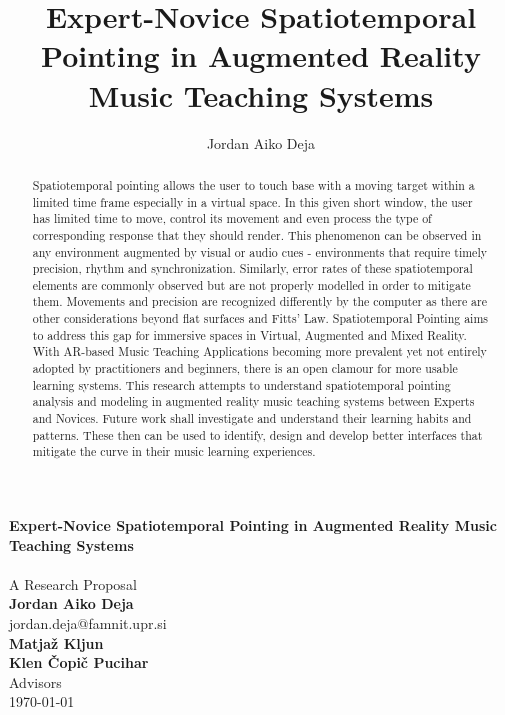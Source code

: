 \documentclass{article}
\title{Expert-Novice Spatiotemporal Pointing in Augmented Reality Music Teaching Systems}
\author{Jordan Aiko Deja}
\begin{document}
\begin{center}
\large \textbf{Expert-Novice Spatiotemporal Pointing in Augmented Reality Music Teaching Systems}
\\            
\vspace{0.5cm}\\
A Research Proposal\\
\vspace{0.5cm}
\textbf{Jordan Aiko Deja}\\
jordan.deja@famnit.upr.si\\
\vspace{0.5cm}
\textbf{Matjaž Kljun\\
Klen Čopič Pucihar}\\
Advisors\\
\vspace{0.5cm}
\today
\vspace{0.5cm}
\end{center}

\begin{abstract}
     Spatiotemporal pointing allows the user to touch base with a moving target within a limited time frame especially in a virtual space. In this given short window, the user has limited time to move, control its movement and even process the type of corresponding response that they should render. This phenomenon can be observed in any environment augmented by visual or audio cues - environments that require timely precision, rhythm and synchronization. Similarly, error rates of these spatiotemporal elements are commonly observed but are not properly modelled in order to mitigate them. Movements and precision are recognized differently by the computer as there are other considerations beyond flat surfaces and Fitts' Law. Spatiotemporal Pointing aims to address this gap for immersive spaces in Virtual, Augmented and Mixed Reality. With AR-based Music Teaching Applications becoming more prevalent yet not entirely adopted by practitioners and beginners, there is an open clamour for more usable learning systems. This research attempts to understand spatiotemporal pointing analysis and modeling in augmented reality music teaching systems between Experts and Novices. Future work shall investigate and understand their learning habits and patterns.  These then can be used to identify, design and develop better interfaces that mitigate the curve in their music learning experiences. 
\end{abstract}
\end{document}
